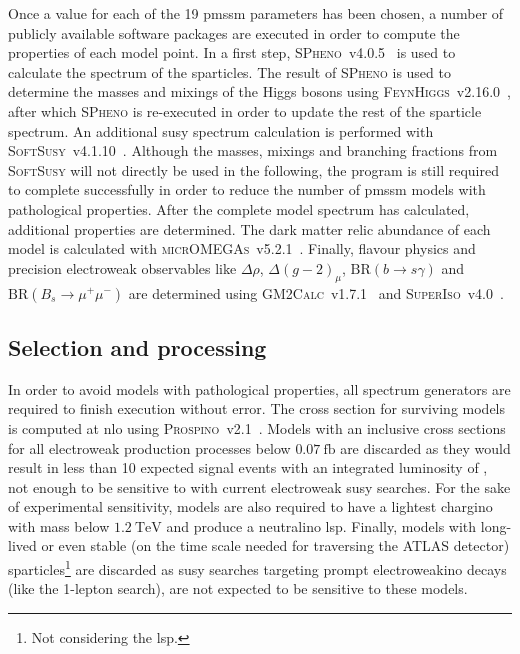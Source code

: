 Once a value for each of the 19 \gls{pmssm} parameters has been chosen, a number of publicly available software packages are executed in order to compute the properties of each model point. In a first step, \textsc{SPheno}~v4.0.5~\cite{spheno_1:2003um,spheno_2:2011nf} is used to calculate the spectrum of the sparticles. The result of \textsc{SPheno} is used to determine the masses and mixings of the Higgs bosons using \textsc{FeynHiggs}~v2.16.0~\cite{FeynHiggs:1998yj,FeynHiggs_1:2018qog,FeynHiggs_2:2013ria}, after which \textsc{SPheno} is re-executed in order to update the rest of the sparticle spectrum. An additional \gls{susy} spectrum calculation is performed with \textsc{SoftSusy}~v4.1.10~\cite{softsusy:2001kg}. Although the masses, mixings and branching fractions from \textsc{SoftSusy} will not directly be used in the following, the program is still required to complete successfully in order to reduce the number of \gls{pmssm} models with pathological properties. After the complete model spectrum has calculated, additional properties are determined. The dark matter relic abundance of each model is calculated with \textsc{micrOMEGAs}~v5.2.1~\cite{micromegas_1:2006is,micromegas_2:2010pz}. Finally, flavour physics and precision electroweak observables like $\Delta\rho$, $\Delta(g-2)_\mu$, $\mathrm{BR}(b\rightarrow s\gamma)$ and $\mathrm{BR}(B_s\rightarrow \mu^+\mu^-)$ are determined using \textsc{GM2Calc}~v1.7.1~\cite{gm2:2015rva} and \textsc{SuperIso}~v4.0~\cite{superiso:2008tp}.

\subsection{Selection and processing}

In order to avoid models with pathological properties, all spectrum generators are required to finish execution without error. The cross section for surviving models is computed at \gls{nlo} using \textsc{Prospino}~v2.1~\cite{prospino:314229, prospino_2:1999xh}. Models with an inclusive cross sections for all electroweak production processes below $\SI{0.07}{\femto\barn}$ are discarded as they would result in less than 10 expected signal events with an integrated luminosity of \onethirtynineifb, not enough to be sensitive to with current electroweak \gls{susy} searches. For the sake of experimental sensitivity, models are also required to have a lightest chargino with mass below $\SI{1.2}{\TeV}$ and produce a neutralino \gls{lsp}. Finally, models with long-lived or even stable (on the time scale needed for traversing the ATLAS detector) sparticles\footnote{Not considering the \gls{lsp}.} are discarded as \gls{susy} searches targeting prompt electroweakino decays (like the 1-lepton search), are not expected to be sensitive to these models. 

